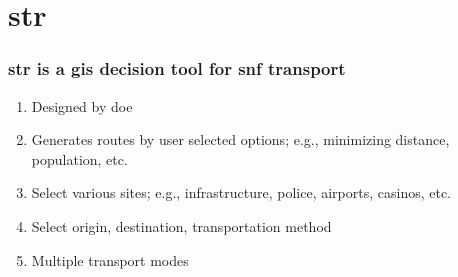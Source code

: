 \documentclass[aspectratio=1610,pdftex,dvipsnames,compress,xcolor={dvipsnames}]{beamer}
\newcommand{\acf}{\acrfull} %
\newcommand{\acs}{\acrshort} %
\begin{document}
\section{\acf{str}}


\addtocounter{framenumber}{-1} 
\begin{frame}
    \frametitle{\acs{str} is a \acs{gis} decision tool for \acs{snf} transport}
    \begin{enumerate}%
        \item[]Designed by \acs{doe}
        \item[]Generates routes by user selected options; e.g., minimizing distance, population, etc.
        \item[]Select various sites; e.g., infrastructure, police, airports, casinos, etc.
        \item[]Select origin, destination, transportation method
        \item[]Multiple transport modes
    \end{enumerate}

    \vspace*{\fill}
    \textbf{\tiny\cite{abk16a}\tiny\hspace{0.05in}}
\end{frame}
\end{document}
